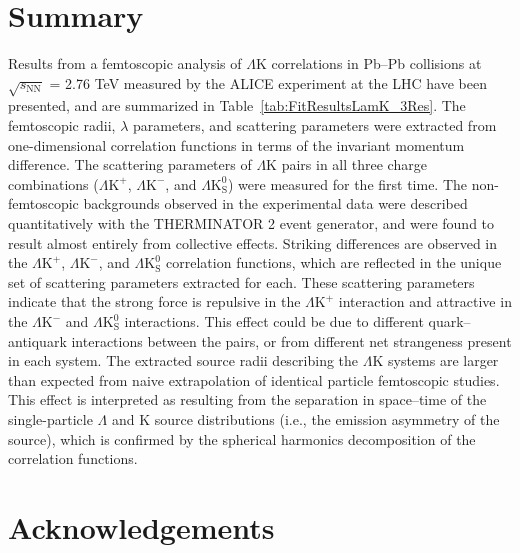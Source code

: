 \documentclass[ALICE,manyauthors]{cernphprep}
\newcommand{\ResultsDirBaseLamKch}{/home/jesse/Analysis/FemtoAnalysis/Results/Results_cLamcKch_20190319/}
\newcommand{\MomRes}{_MomResCrctn}%
\newcommand{\NonFlatBgdLamKch}{_NonFlatBgdCrctnLamK0LamKchPolynomial}
\newcommand{\ResNum}{_3Res}
\newcommand{\PrimMaxDecay}{_PrimMaxDecay10fm}
\newcommand{\ResMethod}{_UsingXiDataAndCoulombOnly}
\newcommand{\ParamFixAndShareLamKch}{_ShareLam_Dualie_ShareLam_ShareRadii}
\newcommand{\SaveNameModLamKch}{\MomRes\NonFlatBgdLamKch\ResNum\PrimMaxDecay\ResMethod\ParamFixAndShareLamKch}
\newcommand{\Lam}{$\Lambda$\xspace}
\newcommand{\LamK}{$\Lambda$K\xspace}
\newcommand{\LamKchP}{$\Lambda\mathrm{K^{+}}$\xspace}
\newcommand{\LamKchM}{$\Lambda\mathrm{K^{-}}$\xspace}
\newcommand{\LamKs}{$\Lambda\mathrm{K^{0}_{S}}$\xspace}
\begin{document}
\section{Summary}
\label{sec:Summary}



Results from a femtoscopic analysis of \LamK correlations in Pb--Pb collisions at $\sqrt{s_{\mathrm{NN}}}$ = 2.76 TeV measured by the ALICE experiment at the LHC have been presented, and are summarized in Table~\ref{tab:FitResultsLamK_3Res}.
The femtoscopic radii, $\lambda$ parameters, and scattering parameters were extracted from one-dimensional correlation functions in terms of the invariant momentum difference.
The scattering parameters of \LamK pairs in all three charge combinations (\LamKchP, \LamKchM, and \LamKs) were measured for the first time.
The non-femtoscopic backgrounds observed in the experimental data were described quantitatively with the THERMINATOR 2 event generator, and were found to result almost entirely from collective effects.
Striking differences are observed in the \LamKchP, \LamKchM, and \LamKs correlation functions, which are reflected in the unique set of scattering parameters extracted for each.
These scattering parameters indicate that the strong force is repulsive in the \LamKchP interaction and attractive in the \LamKchM and \LamKs interactions.
This effect could be due to different quark--antiquark interactions between the pairs, or from different net strangeness present in each system. 
The extracted source radii describing the \LamK systems are larger than expected from naive extrapolation of identical particle femtoscopic studies.
This effect is interpreted as resulting from the separation in space--time of the single-particle \Lam and K source distributions (i.e., the emission asymmetry of the source), which is confirmed by the spherical harmonics decomposition of the correlation functions.

\newenvironment{acknowledgement}{\relax}{\relax}
\begin{acknowledgement}
\section*{Acknowledgements}
\end{acknowledgement}
\end{document}
